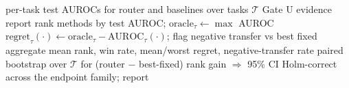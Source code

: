 \begin{algorithm}[t]
\caption{Universal Evidence Evaluation (Gate U)}
\label{alg:gate-u}
\begin{algorithmic}[1]
\Require per-task test AUROCs for router and baselines over tasks $\mathcal{T}$
\Ensure Gate U evidence report
  \State rank methods by test AUROC; $\mathrm{oracle}_\tau \gets \max$ AUROC
  \State $\mathrm{regret}_\tau(\cdot) \gets \mathrm{oracle}_\tau - \mathrm{AUROC}_\tau(\cdot)$; flag negative transfer vs best fixed
\EndFor
\State aggregate mean rank, win rate, mean/worst regret, negative-transfer rate
\State paired bootstrap over $\mathcal{T}$ for (router $-$ best-fixed) rank gain $\Rightarrow$ 95\% CI
\State Holm-correct across the endpoint family; \Return report
\end{algorithmic}
\end{algorithm}


